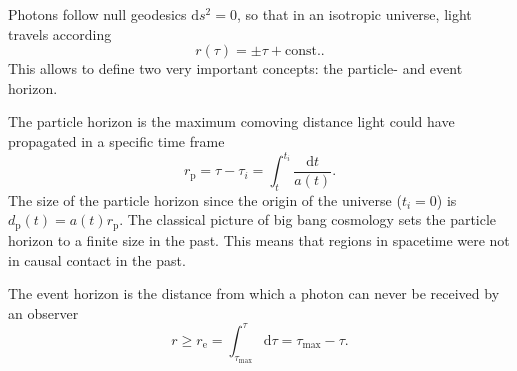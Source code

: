 \documentclass[12pt]{article}
\begin{document}
Photons follow null geodesics $\mathrm{d}s^2 = 0$, so that in an isotropic universe, light travels according
\begin{equation}
    r(\tau) = \pm \tau + \mathrm{ const.}.
\end{equation}
This allows to define two very important concepts: the particle- and event horizon.

The particle horizon is the maximum comoving distance light could have propagated in a specific time frame
\begin{equation}
    r_{\mathrm{p}} = \tau - \tau_i = \int_{t}^{t_i} \frac{\mathrm{d}t}{a(t)}.
\end{equation}
The size of the particle horizon since the origin of the universe ($t_i = 0$) is $d_\mathrm{p}(t) = a(t) r_{\mathrm{p}}$. The classical picture of big bang cosmology sets the particle horizon to a finite size in the past. This means that regions in spacetime were not in causal contact in the past. 

The event horizon is the distance from which a photon can never be received by an observer
\begin{equation}
    r \geq r_\mathrm{e} = \int_{\tau_\mathrm{max}}^{\tau} \mathrm{d}\tau = \tau_\mathrm{max} - \tau.
\end{equation}
\end{document}
